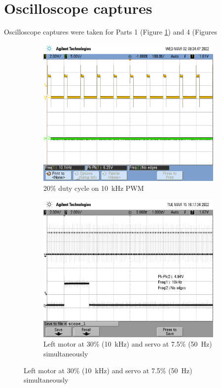 \documentclass[CMPE]{../KGCOEReport}
\begin{document}
	\section*{Oscilloscope captures}

	Oscilloscope captures were taken for Parts 1 (Figure \ref{fig:cap1}) and 4
	(Figures

	\begin{figure}[ht]
		\centering
		 \begin{subfigure}[b]{0.4\textwidth}
		     \centering
		     \includegraphics[width=\textwidth]{scope_0}
		     \caption{20\% duty cycle on \SI{10}{\kilo\hertz} PWM}
		     \label{fig:cap1}
		 \end{subfigure}
		 \hfill
		 \begin{subfigure}[b]{0.4\textwidth}
		     \centering
		     \includegraphics[width=\textwidth]{scope_1}
		     \caption{Left motor at 30\% (\SI{10}{\kilo\hertz}) and servo at 7.5\% (\SI{50}{\hertz}) simultaneously}
		     \label{fig:cap2}
		 \end{subfigure}
	\end{figure}
\end{document}
